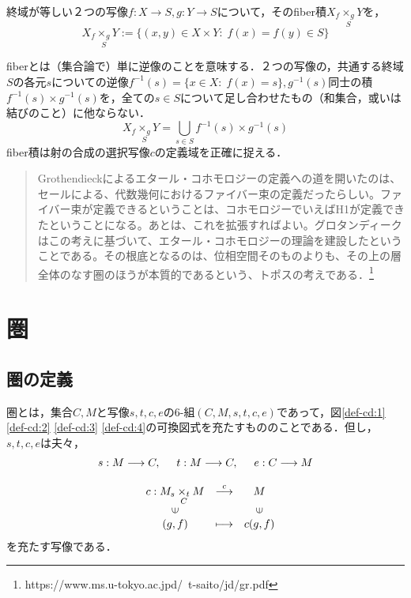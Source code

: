 \documentclass[uplatex, 12pt, a4paper, dvipdfmx]{jsarticle}
\begin{document}
\begin{shadebox}\begin{definition}[fiber積]終域が等しい２つの写像$f:X\longrightarrow S, g:Y\longrightarrow S$について，その\rm{fiber積}$X_f\underset{S}{\times_g}Y$を，$$X_f\underset{S}{\times_g}Y:=\{ (x,y)\in X\times Y:\; f(x)=f(y)\in S \}$$  \end{definition}\end{shadebox}
fiberとは（集合論で）単に逆像のことを意味する．２つの写像の，共通する終域$S$の各元$s$についての逆像$f^{-1}(s)=\{ x\in X:\; f(x)=s \},g^{-1}(s)$同士の積$f^{-1}(s)\times g^{-1}(s)$を，全ての$s\in S$について足し合わせたもの（和集合，或いは結びのこと）に他ならない．$$X_f\underset{S}{\times_g}Y=\bigcup_{s\in S}f^{-1}(s)\times g^{-1}(s)$$
fiber積は射の合成の選択写像$c$の定義域を正確に捉える．

\begin{quote}
    Grothendieckによるエタール・コホモロジーの定義への道を開いたのは、セールによる、代数幾何におけるファイバー束の定義だったらしい。ファイバー束が定義できるということは、コホモロジーでいえばH1が定義できたということになる。あとは、これを拡張すればよい。グロタンディークはこの考えに基づいて、エタール・コホモロジーの理論を建設したということである。その根底となるのは、位相空間そのものよりも、その上の層全体のなす圏のほうが本質的であるという、トポスの考えである．\footnote{https://www.ms.u-tokyo.ac.jpd/~t-saito/jd/gr.pdf}
\end{quote}

\clearpage


\section{圏}
\subsection{圏の定義}
\begin{shadebox}\begin{definition}[圏]\label{def-category}圏とは，集合$C,M$と写像$s,t,c,e$の6-組$(C,M,s,t,c,e)$であって，図\ref{def-cd:1} \ref{def-cd:2} \ref{def-cd:3} \ref{def-cd:4}の可換図式を充たすもののことである．但し，$s,t,c,e$は夫々，\begin{eqnarray*}s:M\longrightarrow C,\hspace{5mm} t:M\longrightarrow C, \hspace{5mm} e:C\longrightarrow M\\[3mm] \left. 
\begin{array}{ccc}
    c:M_s\underset{C}{\times_t}M & \stackrel{c}{\longrightarrow} & M \\
    \rotatebox{90}{$\in$} & & \rotatebox{90}{$\in$} \\
    (g,f) & \longmapsto & c(g,f)
\end{array} \right. \hspace{10mm} \end{eqnarray*}を充たす写像である．

\vspace{1mm} \end{definition}\end{shadebox}
\end{document}
